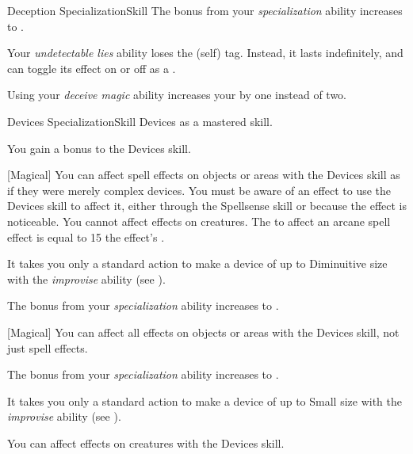 \begin{feat}{Deception Specialization}{Skill}
         The bonus from your \textit{specialization} ability increases to .

         Your \textit{undetectable lies} ability loses the  (self) tag.
        Instead, it lasts indefinitely, and can toggle its effect on or off as a .

         Using your \textit{deceive magic} ability increases your  by one instead of two.
    \end{feat}

    \begin{feat}{Devices Specialization}{Skill}
        \featpre Devices as a mastered skill.

         You gain a  bonus to the Devices skill.

        [Magical] You can affect spell effects on objects or areas with the Devices skill as if they were merely complex devices.
        You must be aware of an effect to use the Devices skill to affect it, either through the Spellsense skill or because the effect is noticeable.
        You cannot affect effects on creatures.
        The  to affect an arcane spell effect is equal to 15 \add the effect's .

         It takes you only a standard action to make a device of up to Diminuitive size with the \textit{improvise} ability (see ).

         The bonus from your \textit{specialization} ability increases to .
        
        [Magical] You can affect all  effects on objects or areas with the Devices skill, not just spell effects.

         The bonus from your \textit{specialization} ability increases to .

         It takes you only a standard action to make a device of up to Small size with the \textit{improvise} ability (see ).

         You can affect  effects on creatures with the Devices skill.
    \end{feat}

